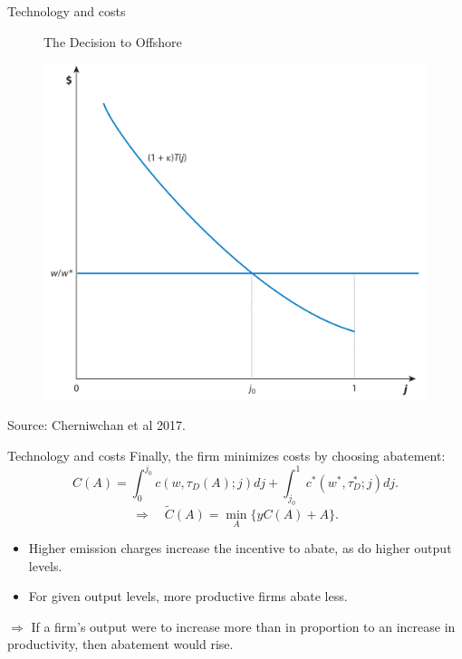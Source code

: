 \documentclass{beamer}
\begin{document}
\begin{frame}[label=figure1]{Technology and costs}
	\begin{figure}[h]
		\centering
		The Decision to Offshore

		\includegraphics[scale=0.23]{figure1.png}
	\end{figure}
	Source: Cherniwchan et al 2017.
	\hfill\hyperlink{wfa}{}
	\hfill\hyperlink{poh}{}
\end{frame}
\begin{frame}{Technology and costs}
	Finally, the firm minimizes costs by choosing abatement:
	\begin{equation}
		C(A) = \int^{j_0}_0 c(w,\tau_D(A);j)dj + \int_{j_0}^1 c^*(w^*,\tau_D^*;j)dj.
	\end{equation}
	\begin{equation}
		\Rightarrow \quad \tilde{C}(A)=\min_A \{yC(A)+A\}.
	\end{equation}
	\begin{itemize}
		\item Higher emission charges increase the incentive to abate, as do higher output levels.
		\item For given output levels, more productive firms abate less.
	\end{itemize}
	\medskip
	$\Rightarrow$ If a firm's output were to increase more than in proportion to an increase in productivity, then abatement would rise.
\end{frame}
\end{document}
